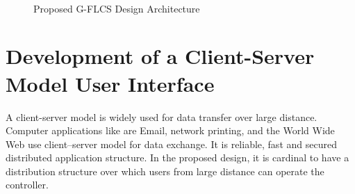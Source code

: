 \begin{figure}[h!]
	\centering	
	 \\
	\caption{Proposed G-FLCS Design Architecture}
	\label{fig:sysArch}
\end{figure}
\section{Development of a Client\hyp{}Server Model User Interface} \label{sec:WebUI}
A client\hyp{}server model is widely used for data transfer over large distance. Computer applications like are Email, network printing, and the World Wide Web use client–server model for data exchange. It is reliable, fast and secured distributed application structure. In the proposed design, it is cardinal to have a distribution structure over which users from large distance can operate the controller. 
